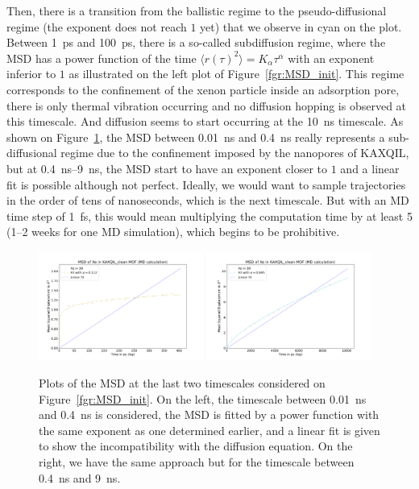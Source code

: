 \documentclass[main]{subfiles}
\begin{document}
Then, there is a transition from the ballistic regime to the pseudo-diffusional regime (the exponent does not reach $1$ yet) that we observe in cyan on the plot. Between \SI{1}{\ps} and \SI{100}{\ps}, there is a so-called subdiffusion regime, where the MSD has a power function of the time $\langle {r(\tau)}^2 \rangle=K_\alpha\tau^\alpha$ with an exponent inferior to $1$ as illustrated on the left plot of Figure~\ref{fgr:MSD_init}. This regime corresponds to the confinement of the xenon particle inside an adsorption pore, there is only thermal vibration occurring and no diffusion hopping is observed at this timescale. And diffusion seems to start occurring at the \SI{10}{\ns} timescale. As shown on Figure~\ref{fgr:MSD_linear_init}, the MSD between \SI{0.01}{\ns} and \SI{0.4}{\ns} really represents a sub-diffusional regime due to the confinement imposed by the nanopores of KAXQIL, but at \SI{0.4}{\ns}--\SI{9}{\ns}, the MSD start to have an exponent closer to $1$ and a linear fit is possible although not perfect. Ideally, we would want to sample trajectories in the order of tens of nanoseconds, which is the next timescale. But with an MD time step of \SI{1}{\fs}, this would mean multiplying the computation time by at least 5 (1--2 weeks for one MD simulation), which begins to be prohibitive. 

\begin{figure}[ht]
  \centering
\includegraphics[width=0.48\textwidth]{figures/5-diffusion/MSD_Xe_coeff_KAXQIL_clean_1.pdf}
\includegraphics[width=0.48\textwidth]{figures/5-diffusion/MSD_Xe_coeff_KAXQIL_clean_2.pdf}
\caption{ Plots of the MSD at the last two timescales considered on Figure~\ref{fgr:MSD_init}. On the left, the timescale between \SI{0.01}{\ns} and \SI{0.4}{\ns} is considered, the MSD is fitted by a power function with the same exponent as one determined earlier, and a linear fit is given to show the incompatibility with the diffusion equation. On the right, we have the same approach but for the timescale between \SI{0.4}{\ns} and \SI{9}{\ns}. }\label{fgr:MSD_linear_init}
\end{figure}
\end{document}
